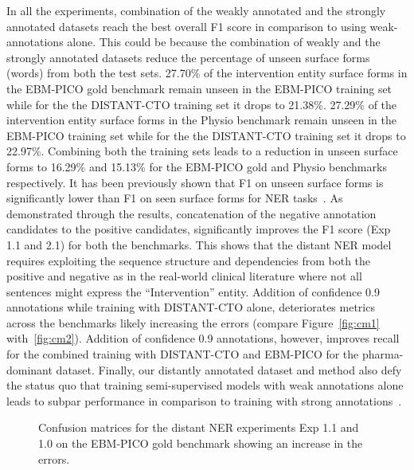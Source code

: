 \documentclass[letterpaper]{article} %
\begin{document}
In all the experiments, combination of the weakly annotated and the strongly annotated datasets reach the best overall F1 score in comparison to using weak-annotations alone.
This could be because the combination of weakly and the strongly annotated datasets reduce the percentage of unseen surface forms (words) from both the test sets.
27.70\% of the intervention entity surface forms in the EBM-PICO gold benchmark remain unseen in the EBM-PICO training set while for the the DISTANT-CTO training set it drops to 21.38\%.
27.29\% of the intervention entity surface forms in the Physio benchmark remain unseen in the EBM-PICO training set while for the the DISTANT-CTO training set it drops to 22.97\%.
Combining both the training sets leads to a reduction in unseen surface forms to 16.29\% and 15.13\% for the EBM-PICO gold and Physio benchmarks respectively.
It has been previously shown that F1 on unseen surface forms is significantly lower than F1 on seen surface forms for NER tasks~\cite{augenstein2017generalisation}.
As demonstrated through the results, concatenation of the negative annotation candidates to the positive candidates, significantly improves the F1 score (Exp 1.1 and 2.1) for both the benchmarks.
This shows that the distant NER model requires exploiting the sequence structure and dependencies from both the positive and negative as in the real-world clinical literature where not all sentences might express the ``Intervention'' entity.
Addition of confidence 0.9 annotations while training with DISTANT-CTO alone, deteriorates metrics across the benchmarks likely increasing the errors (compare Figure~\ref{fig:cm1} with~\ref{fig:cm2}).
Addition of confidence 0.9 annotations, however, improves recall for the combined training with DISTANT-CTO and EBM-PICO for the pharma-dominant dataset.
Finally, our distantly annotated dataset and method also defy the status quo that training semi-supervised models with weak annotations alone leads to subpar performance in comparison to training with strong annotations~\cite{shang2018learning,jiang2021named}.
%
%
\begin{figure}[!tbp]
  \centering
  \hfill
  \caption{Confusion matrices for the distant NER experiments Exp 1.1 and 1.0 on the EBM-PICO gold benchmark showing an increase in the errors.}
\end{figure}
%
%
%
\end{document}

